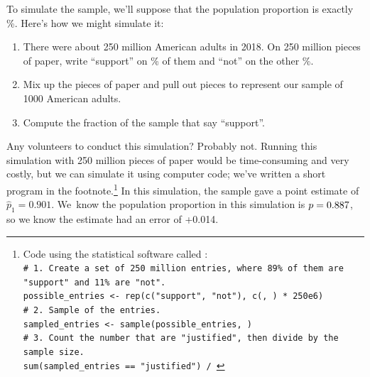 To simulate the sample, we'll suppose that the population
proportion is exactly \pewsolarpollpercent{}\%.
Here's how we might simulate it:
\begin{enumerate}
\item There were about 250 million American adults in 2018.
    On 250 million pieces of paper, write ``support''
    on \pewsolarpollpercent{}\% of them and ``not'' on
    the other \pewsolarpollpercentcomplement{}\%.
\item Mix up the pieces of paper and pull out \pewsolarpollsize{}
    pieces to represent our sample of 1000 American adults.
\item Compute the fraction of the sample that say ``support''.
\end{enumerate}
Any volunteers to conduct this simulation? Probably not. Running
this simulation with 250 million pieces of paper would be
time-consuming and very costly, but we can simulate it
using computer code; we've written a short program in the
footnote.\footnote{Code using the statistical software called \R: \\
\texttt{\# 1. Create a set of 250 million entries,
where 89\% of them are "support" and 11\% are "not". \\
possible\_entries <- rep(c("support", "not"),
    c(\pewsolarpollprop{}, \pewsolarpollpropcomplement{}) * 250e6)\\
\# 2. Sample \pewsolarpollsize{} of the entries. \\
sampled\_entries <- sample(possible\_entries, \pewsolarpollsize{}) \\
\# 3. Count the number that are "justified", then divide
by the sample size. \\
sum(sampled\_entries == "justified") / \pewsolarpollsize{}}}
In this simulation, the sample gave a point estimate of
$\hat{p}_1 = 0.901$. We~know the population proportion
in this simulation is $p = 0.887{}$, so we know
the estimate had an error of +0.014.

